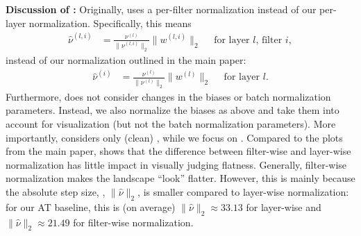 \textbf{Discussion of \cite{LiNIPS2018}:}
%
Originally, \cite{LiNIPS2018} uses a per-filter normalization instead of our per-layer normalization. Specifically, this means
\begin{align}
	\hat{\nu}^{(l,i)} &= \frac{\nu^{(l)}}{\|\nu^{(l,i)}\|_2} \|w^{(l,i)}\|_2\quad\text{ for layer }l\text{, filter }i,\label{eq:supp-normalization-filter}
\end{align}
instead of our normalization outlined in the main paper:
\begin{align}
	\hat{\nu}^{(i)} &= \frac{\nu^{(l)}}{\|\nu^{(l)}\|_2} \|w^{(l)}\|_2\quad\text{ for layer }l.\label{eq:supp-normalization}
\end{align}
Furthermore, \cite{LiNIPS2018} does not consider changes in the biases or batch normalization parameters. Instead, we also normalize the biases as above and take them into account for visualization (but not the batch normalization parameters). More importantly, \cite{LiNIPS2018} considers only (clean) \CE, while we focus on \RCE. Compared to the plots from the main paper,  shows that the difference between filter-wise and layer-wise normalization has little impact in visually judging flatness. Generally, filter-wise normalization makes the \RCE landscape ``look'' flatter. However, this is mainly because the absolute step size, \ie, $\|\hat{\nu}\|_2$, is smaller compared to layer-wise normalization: for our AT baseline, this is (on average) $\|\hat{\nu}\|_2 \approx 33.13$ for layer-wise and $\|\hat{\nu}\|_2 \approx 21.49$ for filter-wise normalization.

